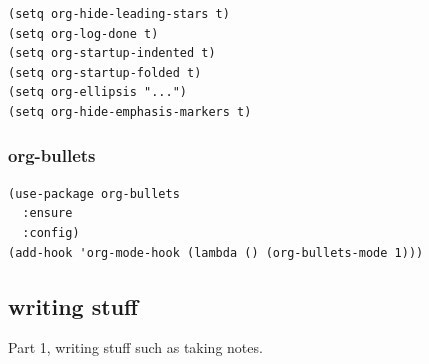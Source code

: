 \documentclass[11pt]{article}
\begin{document}
\begin{verbatim}
(setq org-hide-leading-stars t)
(setq org-log-done t)
(setq org-startup-indented t)
(setq org-startup-folded t)
(setq org-ellipsis "...")
(setq org-hide-emphasis-markers t)
\end{verbatim}

\subsubsection{org-bullets}
\label{sec:org96e500a}
\begin{verbatim}
(use-package org-bullets
  :ensure
  :config)
(add-hook 'org-mode-hook (lambda () (org-bullets-mode 1)))
\end{verbatim}
\subsection{writing stuff}
\label{sec:org4f11a5a}

Part 1, writing stuff such as taking notes.
\end{document}
